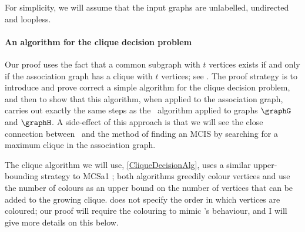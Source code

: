 For simplicity, we will assume that the input graphs are unlabelled,
undirected and loopless.

\paragraph{An algorithm for the clique decision problem} Our proof uses the
fact that a common subgraph with $t$ vertices exists if and only if the
association graph has a clique with $t$ vertices; see
.  The proof strategy is to introduce and prove
correct
a simple algorithm for the clique decision problem, and then to show that this
algorithm, when applied to the association graph, carries out exactly the same
steps as the \McSplit\ algorithm applied to graphs $\graphG$ and $\graphH$.  A
side-effect of this approach is that we will see the close connection between
\McSplit\ and the method of finding an MCIS by searching for a maximum clique in the
association graph.

The clique algorithm we will use, \cref{CliqueDecisionAlg},
uses a similar upper-bounding strategy to MCSa1 \citep{DBLP:journals/algorithms/Prosser12,DBLP:journals/ieicet/TomitaSHW13,DBLP:conf/cp/McCreeshNPS16};
both algorithms greedily colour vertices and use the number of colours
as an upper bound on the number of vertices that can be added to the growing clique.
 does not specify the order in which vertices are coloured;
our proof will require the colouring to mimic \McSplit's behaviour, and I will give
more details on this below.

